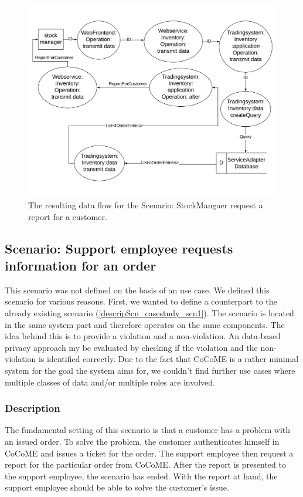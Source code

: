 \begin{figure}
\includegraphics[scale=0.7, angle=90]{logos/Data_flow_UC13.pdf}
\caption{The resulting data flow for the Scenario: StockMangaer request a report for a customer.}
\label{fig:DFUC13}
\end{figure}
\subsection{Scenario: Support employee requests information for an order}
This scenario was not defined on the basis of an use case. We defined this scenario for various reasons. First, we wanted to define a counterpart to the already existing scenario (\autoref{descripScn_casestudy_scn1}). The scenario is located in the same system part and therefore operates on the same components. The idea behind this is to provide a violation and a non-violation. An data-based privacy approach my be evaluated by checking if the violation and the non-violation is identified correctly. Due to the fact that CoCoME is a rather minimal system for the goal the system aims for, we couldn't find further use cases where multiple classes of data and/or multiple roles are involved.
\subsubsection{Description}
\label{scn2_ch4}
The fundamental setting of this scenario is that a customer has a problem with an issued order. To solve the problem, the customer authenticates himself in CoCoME and issues a ticket for the order. The support employee then request a report for the particular order from CoCoME. After the report is presented to the support employee, the scenario has ended. With the report at hand, the support employee should be able to solve the customer's issue.\\

